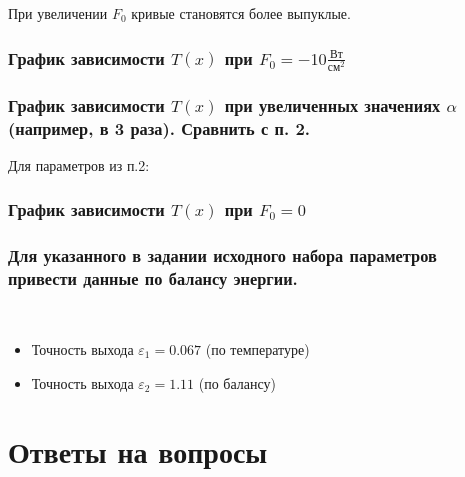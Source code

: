 При увеличении $F_0$ кривые становятся более выпуклые.

\clearpage

\subsection{График зависимости $T(x)$ при $F_{0} = -10 \frac{\text{Вт}}{\text{см}^2}$}


\clearpage

\subsection{График зависимости $T(x)$ при увеличенных значениях $\alpha$ (например, в 3 раза). Сравнить с п. 2.}


\clearpage

Для параметров из п.2:


\clearpage

\subsection{График зависимости $T(x)$ при $F_{0} = 0$}



\subsection{Для указанного в задании исходного набора параметров привести данные по балансу энергии.}\\

\begin{itemize}
	\item Точность выхода $\varepsilon_{1} = 0.067$ (по температуре)
	\item Точность выхода $\varepsilon_{2} = 1.11$ (по балансу)
\end{itemize}

\chapter{Ответы на вопросы}

